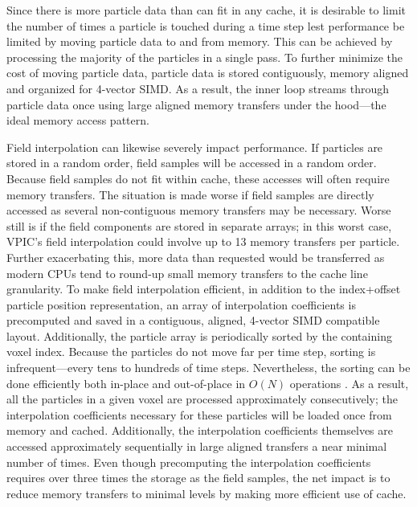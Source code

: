 \documentclass[journal,twoside]{IEEEtran}
\begin{document}
Since there is more particle data than can fit in any cache, it is
desirable to limit the number of times a particle is touched during a
time step lest performance be limited by moving particle data to and
from memory.  This can be achieved by processing the majority of the
particles in a single pass.  To further minimize the cost of moving
particle data, particle data is stored contiguously, memory aligned
and organized for 4-vector SIMD.  As a result, the inner loop streams
through particle data once using large aligned memory transfers under
the hood---the ideal memory access pattern.

Field interpolation can likewise severely impact performance.  If
particles are stored in a random order, field samples will be accessed
in a random order.  Because field samples do not fit within cache,
these accesses will often require memory transfers.  The situation is
made worse if field samples are directly accessed as several
non-contiguous memory transfers may be necessary.  Worse still is if
the field components are stored in separate arrays; in this worst
case, VPIC's field interpolation could involve up to 13 memory
transfers per particle.  Further exacerbating this, more data than
requested would be transferred as modern CPUs tend to round-up small
memory transfers to the cache line granularity.  To make field
interpolation efficient, in addition to the index+offset particle
position representation, an array of interpolation coefficients is
precomputed and saved in a contiguous, aligned, 4-vector SIMD
compatible layout.  Additionally, the particle array is periodically
sorted by the containing voxel index.  Because the particles do not
move far per time step, sorting is infrequent---every tens to hundreds
of time steps.  Nevertheless, the sorting can be done efficiently both
in-place and out-of-place in $O(N)$ operations \cite{Bowers_2001}.  As
a result, all the particles in a given voxel are processed
approximately consecutively; the interpolation coefficients necessary
for these particles will be loaded once from memory and cached.
Additionally, the interpolation coefficients themselves are accessed
approximately sequentially in large aligned transfers a near minimal
number of times.  Even though precomputing the interpolation
coefficients requires over three times the storage as the field
samples, the net impact is to reduce memory transfers to minimal
levels by making more efficient use of cache.
\end{document}
